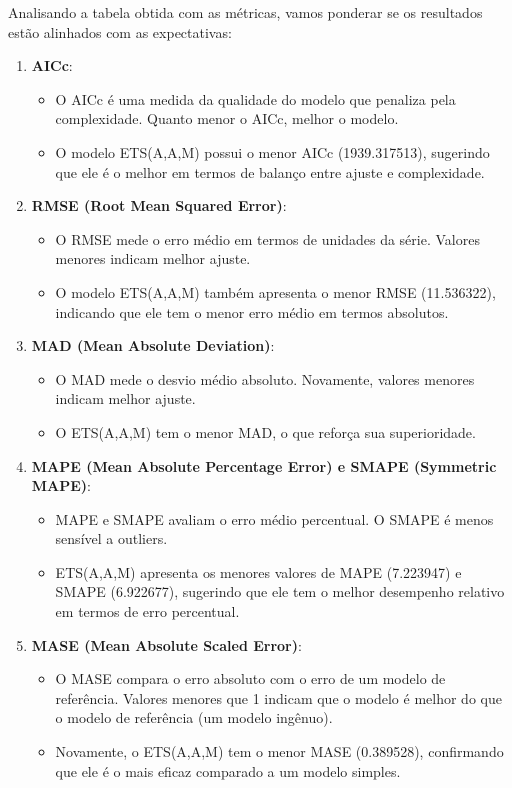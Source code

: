 \documentclass[a4paper, 12pt]{article}
\begin{document}
Analisando a tabela obtida com as métricas, vamos ponderar se os resultados estão alinhados com as expectativas:


\begin{enumerate}
    \item \textbf{AICc}:
    \begin{itemize}
        \item O AICc é uma medida da qualidade do modelo que penaliza pela complexidade. Quanto menor o AICc, melhor o modelo.
        \item O modelo ETS(A,A,M) possui o menor AICc (1939.317513), sugerindo que ele é o melhor em termos de balanço entre ajuste e complexidade.
    \end{itemize}
    \item \textbf{RMSE (Root Mean Squared Error)}:
    \begin{itemize}
        \item O RMSE mede o erro médio em termos de unidades da série. Valores menores indicam melhor ajuste.
        \item O modelo ETS(A,A,M) também apresenta o menor RMSE (11.536322), indicando que ele tem o menor erro médio em termos absolutos.
    \end{itemize}
    \item \textbf{MAD (Mean Absolute Deviation)}:
    \begin{itemize}
        \item O MAD mede o desvio médio absoluto. Novamente, valores menores indicam melhor ajuste.
        \item O ETS(A,A,M) tem o menor MAD, o que reforça sua superioridade.
    \end{itemize}
    \item \textbf{MAPE (Mean Absolute Percentage Error) e SMAPE (Symmetric MAPE)}:
    \begin{itemize}
        \item MAPE e SMAPE avaliam o erro médio percentual. O SMAPE é menos sensível a outliers.
        \item ETS(A,A,M) apresenta os menores valores de MAPE (7.223947) e SMAPE (6.922677), sugerindo que ele tem o melhor desempenho relativo em termos de erro percentual.
    \end{itemize}
    \item \textbf{MASE (Mean Absolute Scaled Error)}:
    \begin{itemize}
        \item O MASE compara o erro absoluto com o erro de um modelo de referência. Valores menores que 1 indicam que o modelo é melhor do que o modelo de referência (um modelo ingênuo).
        \item Novamente, o ETS(A,A,M) tem o menor MASE (0.389528), confirmando que ele é o mais eficaz comparado a um modelo simples. 
        
    \end{itemize}
\end{enumerate}
\end{document}
